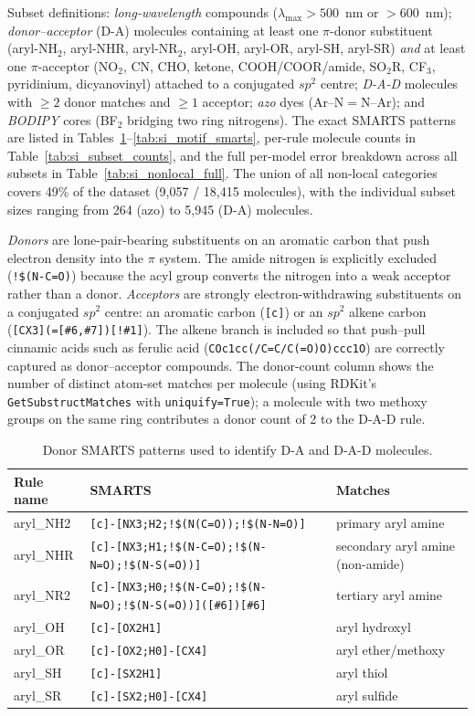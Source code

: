 \documentclass[journal=jcisd8,manuscript=suppinfo]{achemso}
\begin{document}
Subset definitions: \textit{long-wavelength} compounds ($\lambda_{\max} > 500$~nm or $> 600$~nm); \textit{donor--acceptor} (D-A) molecules containing at least one $\pi$-donor substituent (aryl-NH$_2$, aryl-NHR, aryl-NR$_2$, aryl-OH, aryl-OR, aryl-SH, aryl-SR) \emph{and} at least one $\pi$-acceptor (NO$_2$, CN, CHO, ketone, COOH/COOR/amide, SO$_2$R, CF$_3$, pyridinium, dicyanovinyl) attached to a conjugated $sp^2$ centre; \textit{D-A-D} molecules with $\geq 2$ donor matches and $\geq 1$ acceptor; \textit{azo} dyes (Ar--N$=$N--Ar); and \textit{BODIPY} cores (BF$_2$ bridging two ring nitrogens). The exact SMARTS patterns are listed in Tables~\ref{tab:si_donor_smarts}--\ref{tab:si_motif_smarts}, per-rule molecule counts in Table~\ref{tab:si_subset_counts}, and the full per-model error breakdown across all subsets in Table~\ref{tab:si_nonlocal_full}. The union of all non-local categories covers 49\% of the dataset (9{,}057 / 18{,}415 molecules), with the individual subset sizes ranging from 264 (azo) to 5{,}945 (D-A) molecules.

\textit{Donors} are lone-pair-bearing substituents on an aromatic carbon that push electron density into the $\pi$ system. The amide nitrogen is explicitly excluded (\texttt{!\$(N-C=O)}) because the acyl group converts the nitrogen into a weak acceptor rather than a donor.
\textit{Acceptors} are strongly electron-withdrawing substituents on a conjugated $sp^2$ centre: an aromatic carbon (\texttt{[c]}) or an $sp^2$ alkene carbon (\texttt{[CX3](=[\#6,\#7])[!\#1]}). The alkene branch is included so that push--pull cinnamic acids such as ferulic acid (\texttt{COc1cc(/C=C/C(=O)O)ccc1O}) are correctly captured as donor--acceptor compounds.
The donor-count column shows the number of distinct atom-set matches per molecule (using RDKit's \texttt{GetSubstructMatches} with \texttt{uniquify=True}); a molecule with two methoxy groups on the same ring contributes a donor count of 2 to the D-A-D rule.

\begin{table}[htbp]
\centering
\caption{Donor SMARTS patterns used to identify D-A and D-A-D molecules.}
\label{tab:si_donor_smarts}
\scriptsize
\begin{tabular}{lll}
\toprule
\textbf{Rule name} & \textbf{SMARTS} & \textbf{Matches} \\
\midrule
aryl\_NH2 & \verb|[c]-[NX3;H2;!$(N(C=O));!$(N-N=O)]| & primary aryl amine \\
aryl\_NHR & \verb|[c]-[NX3;H1;!$(N-C=O);!$(N-N=O);!$(N-S(=O))]| & secondary aryl amine (non-amide) \\
aryl\_NR2 & \verb|[c]-[NX3;H0;!$(N-C=O);!$(N-N=O);!$(N-S(=O))]([#6])[#6]| & tertiary aryl amine \\
aryl\_OH & \verb|[c]-[OX2H1]| & aryl hydroxyl \\
aryl\_OR & \verb|[c]-[OX2;H0]-[CX4]| & aryl ether/methoxy \\
aryl\_SH & \verb|[c]-[SX2H1]| & aryl thiol \\
aryl\_SR & \verb|[c]-[SX2;H0]-[CX4]| & aryl sulfide \\
\bottomrule
\end{tabular}
\end{table}
\end{document}
